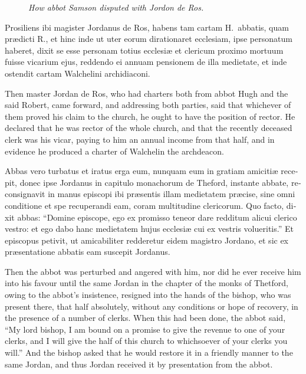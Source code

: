 \documentclass[10pt]{book}
\newcommand{\blockhead}[4][]{
\begin{figure}
\centering
\vspace{#4}
\parbox{2.75cm}{\begin{center}\footnotesize \color{BrickRed} \emph{#2}\\ #1 \end{center}}
\end{figure}
}
\begin{document}
\begin{paracol}{2}
\switchcolumn*

\begin{otherlanguage}{latin}
\blockhead{How abbot Samson disputed with Jordon de Ros.}{4}{-.45cm}
Prosiliens ibi magister Jordanus de Ros, habens tam cartam H.\ abbatis, quam pr\ae{}dicti R., et hinc inde ut uter eorum dirationaret ecclesiam, ipse personatum haberet, dixit se esse personam totius ecclesi\ae{} et clericum proximo mortuum fuisse vicarium ejus, reddendo ei annuam pensionem de illa medietate, et inde ostendit cartam Walchelini archidiaconi.

\end{otherlanguage}

\switchcolumn

Then master Jordan de Ros, who had charters both from abbot Hugh and the said Robert, came forward, and addressing both parties, said that whichever of them proved his claim to the church, he ought to have the position of rector. He declared that he was rector of the whole church, and that the recently deceased clerk was his vicar, paying to him an annual income from that half, and in evidence he produced a charter of Walchelin the archdeacon.

\switchcolumn*

\begin{otherlanguage}{latin}
Abbas vero turbatus et iratus erga eum, nunquam eum in gratiam amiciti\ae{} recepit, donec ipse Jordanus in capitulo monachorum de Theford, instante abbate, reconsignavit in manus episcopi ibi pr\ae{}sentis illam medietatem pr\ae{}cise, sine omni conditione et spe recuperandi eam, coram multitudine clericorum. Quo facto, dixit abbas: ``Domine episcope, ego ex promisso teneor dare redditum alicui clerico vestro: et ego dabo hanc medietatem hujus ecclesi\ae{} cui ex vestris volueritis.'' Et episcopus petivit, ut amicabiliter redderetur eidem magistro Jordano, et sic ex pr\ae{}sentatione abbatis eam suscepit Jordanus.
\end{otherlanguage}

\switchcolumn

Then the abbot was perturbed and angered with him, nor did he ever receive him into his favour until the same Jordan in the chapter of the monks of Thetford, owing to the abbot's insistence, resigned into the hands of the bishop, who was present there, that half absolutely, without any conditions or hope of recovery, in the presence of a number of clerks. When this had been done, the abbot said, ``My lord bishop, I am bound on a promise to give the revenue to one of your clerks, and I will give the half of this church to whichsoever of your clerks you will.'' And the bishop asked that he would restore it in a friendly manner to the same Jordan, and thus Jordan received it by presentation from the abbot.


\end{paracol}
\end{document}
